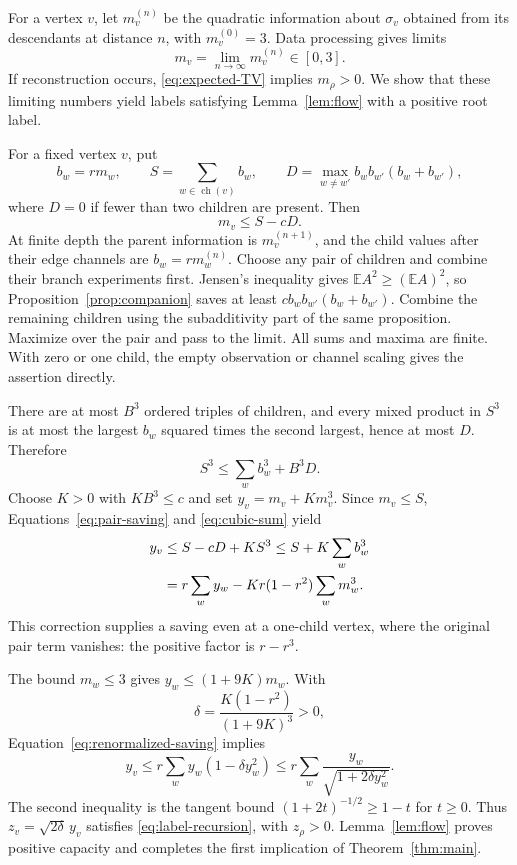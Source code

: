 \documentclass[11pt]{article}
\numberwithin{equation}{section}
\newcommand{\E}{\mathbb E}
\newcommand{\children}{\operatorname{ch}}
\begin{document}
For a vertex $v$, let $m_v^{(n)}$ be the quadratic information
about $\sigma_v$ obtained from its descendants at distance $n$,
with $m_v^{(0)}=3$. Data processing gives limits
\[
 m_v=\lim_{n\to\infty}m_v^{(n)}\in[0,3].
\]
If reconstruction occurs, \eqref{eq:expected-TV} implies
$m_\rho>0$. We show that these limiting numbers yield labels
satisfying Lemma~\ref{lem:flow} with a positive root label.

For a fixed vertex $v$, put
\[
 b_w=rm_w,\qquad S=\sum_{w\in\children(v)}b_w,
 \qquad
 D=\max_{w\ne w'}b_wb_{w'}(b_w+b_{w'}),
\]
where $D=0$ if fewer than two children are present. Then
\begin{equation}\label{eq:pair-saving}
 m_v\leq S-cD.
\end{equation}
At finite depth the parent information is $m_v^{(n+1)}$, and
the child values after their edge channels are $b_w=rm_w^{(n)}$.
Choose any pair of children and combine their branch experiments first.
Jensen's inequality gives $\E A^2\geq(\E A)^2$, so
Proposition~\ref{prop:companion} saves at least
$c b_wb_{w'}(b_w+b_{w'})$. Combine the remaining children using
the subadditivity part of the same proposition. Maximize over the
pair and pass to the limit. All sums and maxima are finite. With
zero or one child, the empty observation or channel scaling gives
the assertion directly.

There are at most $B^3$ ordered triples of children, and every
mixed product in $S^3$ is at most the largest $b_w$ squared times
the second largest, hence at most $D$. Therefore
\begin{equation}\label{eq:cubic-sum}
 S^3\leq\sum_w b_w^3+B^3D.
\end{equation}
Choose $K>0$ with $KB^3\leq c$ and set $y_v=m_v+Km_v^3$.
Since $m_v\leq S$, Equations~\eqref{eq:pair-saving} and
\eqref{eq:cubic-sum} yield
\begin{align}
 y_v&\leq S-cD+KS^3
       \leq S+K\sum_w b_w^3\notag\\
    &=r\sum_w y_w-Kr(1-r^2)\sum_wm_w^3.
       \label{eq:renormalized-saving}
\end{align}
This correction supplies a saving even at a one-child vertex,
where the original pair term vanishes: the positive factor is
$r-r^3$.

The bound $m_w\leq3$ gives $y_w\leq(1+9K)m_w$. With
\[
 \delta=\frac{K(1-r^2)}{(1+9K)^3}>0,
\]
Equation~\eqref{eq:renormalized-saving} implies
\[
 y_v\leq r\sum_wy_w(1-\delta y_w^2)
      \leq r\sum_w\frac{y_w}{\sqrt{1+2\delta y_w^2}}.
\]
The second inequality is the tangent bound
$(1+2t)^{-1/2}\geq1-t$ for $t\geq0$. Thus
$z_v=\sqrt{2\delta}\,y_v$ satisfies
\eqref{eq:label-recursion}, with $z_\rho>0$.
Lemma~\ref{lem:flow} proves positive capacity and completes the
first implication of Theorem~\ref{thm:main}.
\end{document}

